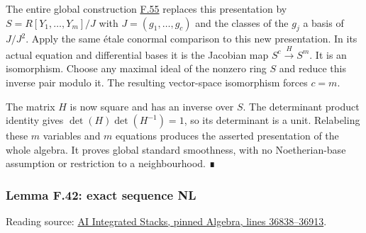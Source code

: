 \documentclass[11pt,a4paper,openany]{report}
\begin{document}
The entire global construction \hyperref[AG-RG-S05-algebra-lemma-huber]{F.55} replaces this presentation by \(S=R[Y_1,\ldots,Y_m]/J\) with \(J=(g_1,\ldots,g_c)\) and the classes of the \(g_j\) a basis of \(J/J^2\). Apply the same étale conormal comparison to this new presentation. In its actual equation and differential bases it is the Jacobian map \(S^c\xrightarrow{H}S^m\). It is an isomorphism. Choose any maximal ideal of the nonzero ring \(S\) and reduce this inverse pair modulo it. The resulting vector-space isomorphism forces \(c=m\).

The matrix \(H\) is now square and has an inverse over \(S\). The determinant product identity gives \(\det(H)\det(H^{-1})=1\), so its determinant is a unit. Relabeling these \(m\) variables and \(m\) equations produces the asserted presentation of the whole algebra. It proves global standard smoothness, with no Noetherian-base assumption or restriction to a neighbourhood. ∎

\label{AG-RG-S05-algebra-lemma-exact-sequence-NL}

\subsubsection{Lemma F.42: exact sequence NL}\label{AG-RG-S05-lemma-f.42-exact-sequence-nl}

Reading source: \href{https://github.com/KokunoYumeto/unofficial-stacks-project-ai-drafts/blob/565b10e987aba5969b21145a0833f42d69f96790/algebra.tex\#L36838-L36913}{AI Integrated Stacks, pinned Algebra, lines 36838--36913}.
\end{document}
